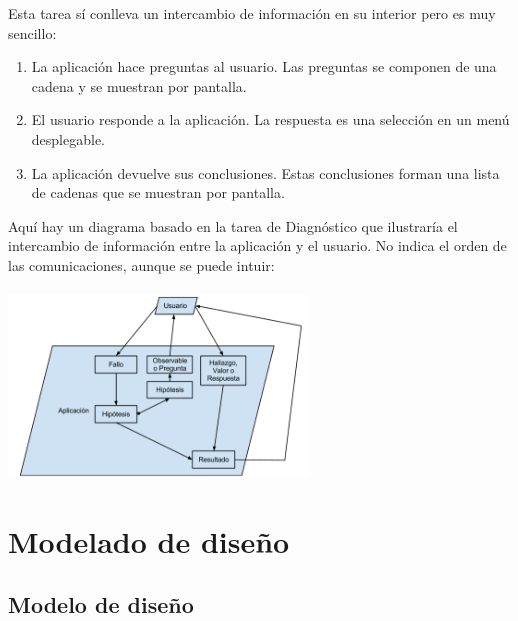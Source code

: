 \documentclass[a4paper,11pt]{article}
\begin{document}
			Esta tarea sí conlleva un intercambio de información en su interior pero es
			muy sencillo:
			\begin{enumerate}
				\item La aplicación hace preguntas al usuario. Las preguntas se componen de
				una cadena y se muestran por pantalla.
				\item El usuario responde a la aplicación. La respuesta es una selección en
				un menú desplegable.
				\item La aplicación devuelve sus conclusiones. Estas conclusiones forman una
				lista de cadenas que se muestran por pantalla.
			\end{enumerate}
			Aquí hay un diagrama basado en la tarea de Diagnóstico que ilustraría el
			intercambio de información entre la aplicación y el usuario. No indica el
			orden de las comunicaciones, aunque se puede intuir:\\\\
			\includegraphics[width=300px]{proceso.png} \\
	\newpage
	\section{Modelado de diseño}
		\subsection{Modelo de diseño}
\end{document}
